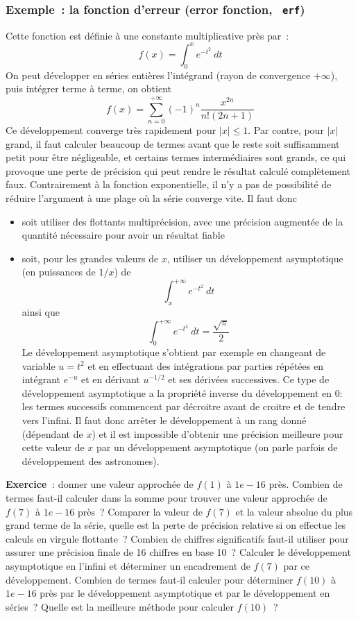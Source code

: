 \documentclass[a4paper,11pt]{article}
\begin{document}
\subsubsection{Exemple~: la fonction d'erreur (error fonction, {\tt
    erf})}
Cette fonction est définie à une constante multiplicative près par~:
\[ f(x)=\int_0^x e^{-t^2} \ dt \]
On peut développer en séries entières l'intégrand (rayon
de convergence $+\infty$), puis intégrer terme
à terme, on obtient
\[ f(x)= \sum_{n=0}^{+\infty} (-1)^n \frac{x^{2n}}{n! (2n+1)}\]
Ce développement converge très rapidement pour $|x|\leq 1$.
Par contre, pour $|x|$ grand, il faut calculer beaucoup de termes
avant que le reste soit suffisamment petit pour être négligeable,
et certains termes intermédiaires sont grands, ce qui provoque
une perte de précision qui peut rendre le résultat calculé
complètement faux. Contrairement à la fonction exponentielle,
il n'y a pas de possibilité de réduire l'argument à une plage
où la série converge vite. Il faut donc
\begin{itemize}
\item soit utiliser des flottants multiprécision, avec une précision
augmentée de la quantité nécessaire pour avoir un résultat fiable
\item soit, pour les grandes valeurs de $x$, utiliser un développement
asymptotique (en puissances de $1/x$) de
\[ \int_x^{+\infty} e^{-t^2} \ dt \]
ainsi que 
\[ \int_0^{+\infty} e^{-t^2} \ dt =\frac{\sqrt{\pi }}{2} \]
Le développement asymptotique
s'obtient par exemple en changeant de variable
$u=t^2$ et en effectuant des intégrations par parties répétées
en intégrant $e^{-u}$ et en dérivant $u^{-1/2}$ et ses dérivées
successives. Ce type de développement asymptotique a la propriété
inverse du développement en 0: les termes successifs commencent
par décroitre avant de croitre et de tendre vers l'infini. Il faut
donc arrêter le développement à un rang donné (dépendant de $x$)
et il est impossible d'obtenir une précision meilleure pour cette
valeur de $x$ par un développement asymptotique (on parle parfois de
développement des astronomes).
\end{itemize}

{\bf Exercice~}: donner une valeur approchée de $f(1)$ à $1e-16$ près.
Combien de termes faut-il calculer dans la somme pour trouver
une valeur approchée de $f(7)$ à $1e-16$ près~? Comparer la valeur
de $f(7)$ et la valeur absolue du plus grand terme de la série,
quelle est la perte de précision relative si on effectue les
calculs en virgule flottante~? Combien de chiffres significatifs
faut-il utiliser pour assurer une précision finale de 16 chiffres
en base 10~? Calculer le développement asymptotique en l'infini
et déterminer un encadrement de $f(7)$ par ce développement. Combien
de termes faut-il calculer pour déterminer $f(10)$ à $1e-16$ près
par le développement asymptotique et par le développement en séries~?
Quelle est la meilleure méthode pour calculer $f(10)$~?
\end{document}

